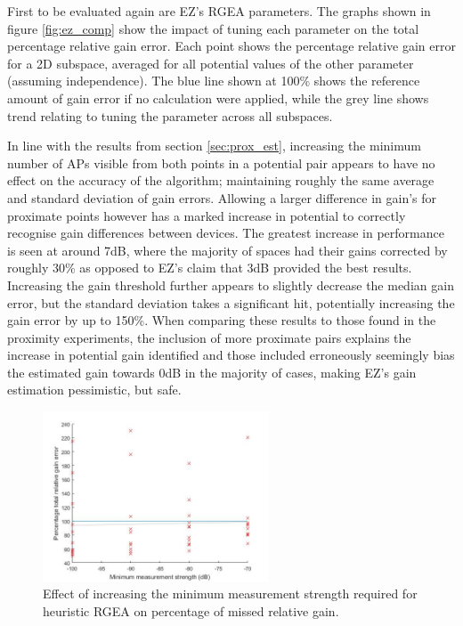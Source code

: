 \documentclass{UoYCSproject}
\begin{document}
                First to be evaluated again are EZ's RGEA parameters. The graphs shown in figure \ref{fig:ez_comp} show the impact of tuning each parameter on the total percentage relative gain error. Each point shows the percentage relative gain error for a 2D subspace, averaged for all potential values of the other parameter (assuming independence). The blue line shown at 100\% shows the reference amount of gain error if no calculation were applied, while the grey line shows trend relating to tuning the parameter across all subspaces.
                
                In line with the results from section \ref{sec:prox_est}, increasing the minimum number of APs visible from both points in a potential pair appears to have no effect on the accuracy of the algorithm; maintaining roughly the same average and standard deviation of gain errors. Allowing a larger difference in gain's for proximate points however has a marked increase in potential to correctly recognise gain differences between devices. The greatest increase in performance is seen at around 7dB, where the majority of spaces had their gains corrected by roughly 30\% as opposed to EZ's claim that 3dB provided the best results. Increasing the gain threshold further appears to slightly decrease the median gain error, but the standard deviation takes a significant hit, potentially increasing the gain error by up to 150\%. When comparing these results to those found in the proximity experiments, the inclusion of more proximate pairs explains the increase in potential gain identified and those included erroneously seemingly bias the estimated gain towards $0$dB in the majority of cases, making EZ's gain estimation pessimistic, but safe.
                
                \begin{figure}[h]
                    \label{fig:h_minAP}
                    \centering
                    \includegraphics[width=0.6\textwidth]{h_minAP.jpg}
                    \caption{Effect of increasing the minimum measurement strength required for heuristic RGEA on percentage of missed relative gain.}
                \end{figure}
                
\end{document}
